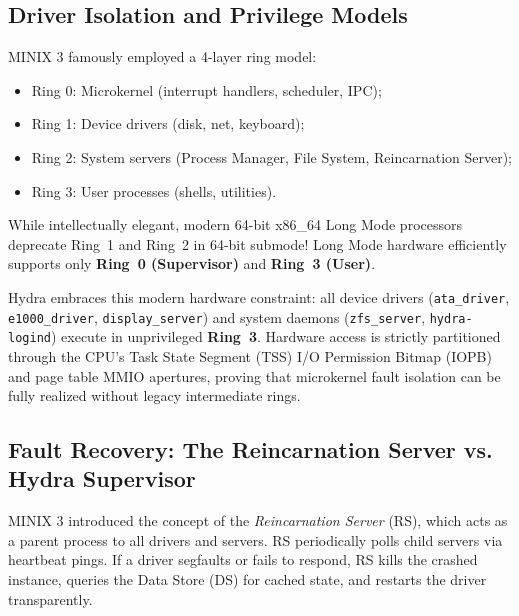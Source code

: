 \subsection{Driver Isolation and Privilege Models}
MINIX 3 famously employed a 4-layer ring model:
\begin{itemize}
    \item Ring 0: Microkernel (interrupt handlers, scheduler, IPC);
    \item Ring 1: Device drivers (disk, net, keyboard);
    \item Ring 2: System servers (Process Manager, File System, Reincarnation Server);
    \item Ring 3: User processes (shells, utilities).
\end{itemize}
While intellectually elegant, modern 64-bit x86\_64 Long Mode processors deprecate Ring~1 and Ring~2 in 64-bit submode! Long Mode hardware efficiently supports only \textbf{Ring~0 (Supervisor)} and \textbf{Ring~3 (User)}.

Hydra embraces this modern hardware constraint: all device drivers (\texttt{ata\_driver}, \texttt{e1000\_driver}, \texttt{display\_server}) and system daemons (\texttt{zfs\_server}, \texttt{hydra-logind}) execute in unprivileged \textbf{Ring~3}. Hardware access is strictly partitioned through the CPU's Task State Segment (TSS) I/O Permission Bitmap (IOPB) and page table MMIO apertures, proving that microkernel fault isolation can be fully realized without legacy intermediate rings.

\subsection{Fault Recovery: The Reincarnation Server vs. Hydra Supervisor}
MINIX 3 introduced the concept of the \textit{Reincarnation Server} (RS), which acts as a parent process to all drivers and servers. RS periodically polls child servers via heartbeat pings. If a driver segfaults or fails to respond, RS kills the crashed instance, queries the Data Store (DS) for cached state, and restarts the driver transparently.

